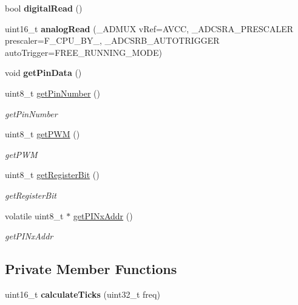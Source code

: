 \begin{DoxyCompactItemize}
bool {\bfseries digital\+Read} ()
\item 
\mbox{\label{classPin_ac678e5fd7f7bc33260eb909178e17367}} 
uint16\+\_\+t {\bfseries analog\+Read} (\+\_\+\+A\+D\+M\+UX v\+Ref=A\+V\+CC, \+\_\+\+A\+D\+C\+S\+R\+A\+\_\+\+P\+R\+E\+S\+C\+A\+L\+ER prescaler=F\+\_\+\+C\+P\+U\+\_\+\+B\+Y\+\_, \+\_\+\+A\+D\+C\+S\+R\+B\+\_\+\+A\+U\+T\+O\+T\+R\+I\+G\+G\+ER auto\+Trigger=F\+R\+E\+E\+\_\+\+R\+U\+N\+N\+I\+N\+G\+\_\+\+M\+O\+DE)
\item 
\mbox{\label{classPin_aa81249603376710b26f6e803db46658e}} 
void {\bfseries get\+Pin\+Data} ()
\item 
uint8\+\_\+t \mbox{\hyperlink{classPin_aaad2c2cc8ccda03ffe9c07e12323cf4d}{get\+Pin\+Number}} ()
\begin{DoxyCompactList}\small\item\em get\+Pin\+Number \end{DoxyCompactList}\item 
uint8\+\_\+t \mbox{\hyperlink{classPin_a5a9c1d0f1937b7083779ca4afba2a607}{get\+P\+WM}} ()
\begin{DoxyCompactList}\small\item\em get\+P\+WM \end{DoxyCompactList}\item 
uint8\+\_\+t \mbox{\hyperlink{classPin_af7d88df8c24769198ee8e022ce0ed0fd}{get\+Register\+Bit}} ()
\begin{DoxyCompactList}\small\item\em get\+Register\+Bit \end{DoxyCompactList}\item 
volatile uint8\+\_\+t $\ast$ \mbox{\hyperlink{classPin_ae2d4f832b081cd2d188151a0c4589f8d}{get\+P\+I\+Nx\+Addr}} ()
\begin{DoxyCompactList}\small\item\em get\+P\+I\+Nx\+Addr \end{DoxyCompactList}\end{DoxyCompactItemize}
\subsection*{Private Member Functions}
\begin{DoxyCompactItemize}
\item 
\mbox{\label{classPin_a6a094c4d39ce02a525e77d1951001b53}} 
uint16\+\_\+t {\bfseries calculate\+Ticks} (uint32\+\_\+t freq)
\end{DoxyCompactItemize}
